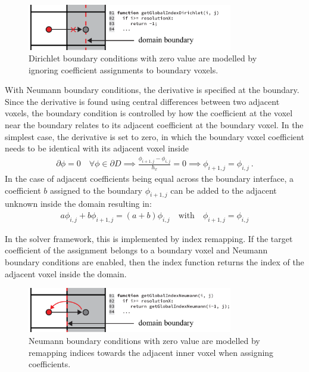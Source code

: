 \begin{figure}[h]
\centering
\includegraphics[width=0.8\textwidth]{04_pn_method/figures/fig_bc_dirichlet.pdf}
\caption{Dirichlet boundary conditions with zero value are modelled by ignoring coefficient assignments to boundary voxels.}
\label{fig:pn_bc_dirichlet}
\end{figure}

With Neumann boundary conditions, the derivative is specified at the boundary. Since the derivative is found using central differences between two adjacent voxels, the boundary condition is controlled by how the coefficient at the voxel near the boundary relates to its adjacent coefficient at the boundary voxel. In the simplest case, the derivative is set to zero, in which the boundary voxel coefficient needs to be identical with its adjacent voxel inside
\begin{align*}
\partial\phi=0\quad\forall\phi\in\partial D
\implies
\frac{\phi_{i+1,j}-\phi_{i,j}}{h_x} = 0
\implies
\phi_{i+1,j}=\phi_{i,j}
\ .
\end{align*}
In the case of adjacent coefficients being equal across the boundary interface, a coefficient $b$ assigned to the boundary $\phi_{i+1,j}$ can be added to the adjacent unknown inside the domain resulting in:
\begin{align}
a\phi_{i,j} + b\phi_{i+1,j} = \left(a+b\right)\phi_{i,j}
\quad \text{with}\quad \phi_{i+1,j}=\phi_{i,j}
\end{align}

In the solver framework, this is implemented by index remapping. If the target coefficient of the assignment belongs to a boundary voxel and Neumann boundary conditions are enabled, then the index function returns the index of the adjacent voxel inside the domain.

\begin{figure}[h]
\centering
\includegraphics[width=0.8\textwidth]{04_pn_method/figures/fig_bc_neumann.pdf}
\caption{Neumann boundary conditions with zero value are modelled by remapping indices towards the adjacent inner voxel when assigning coefficients.}
\label{fig:pn_bc_neumann}
\end{figure}

